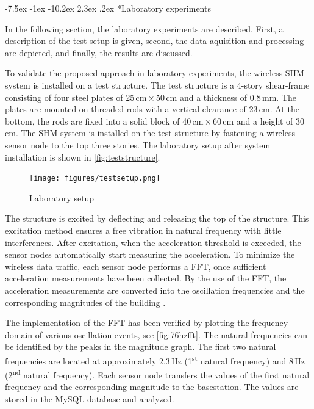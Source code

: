 \documentclass[12pt,a4paper]{scrartcl}
\makeatletter
\renewcommand\section{\@startsection{section}{1}{\z@}%
                     {-7.5ex \@plus -1ex \@minus -10.2ex}%
                     {2.3ex \@plus.2ex}%
                     {\sffamily\large\bfseries}}
\makeatother
\begin{document}


\section*{Laboratory experiments}

In the following section, the laboratory experiments are described.
First, a description of the test setup is given, second, the data aquisition and processing are depicted, and finally, the results are discussed. 

To validate the proposed approach in laboratory experiments, the wireless SHM system is installed on a test structure.
The test structure is a 4-story shear-frame consisting of four steel plates of 25\,cm\,$\times$\,50\,cm and a thickness of 0.8\,mm.
The plates are mounted on threaded rods with a vertical clearance of 23\,cm.
At the bottom, the rods are fixed into a solid block of 40\,cm\,$\times$\,60\,cm and a height of 30\,cm.
The SHM system is installed on the test structure by fastening a wireless sensor node to the top three stories.
The laboratory setup after system installation is shown in \autoref{fig:teststructure}.

\begin{figure}[ht]
    \centering
    \texttt{[image: figures/testsetup.png]}
    \caption{Laboratory setup}
    \label{fig:teststructure}
\end{figure}

The structure is excited by deflecting and releasing the top of the structure.
This excitation method ensures a free vibration in natural frequency with little interferences.
After excitation, when the acceleration threshold is exceeded, the sensor nodes automatically start measuring the acceleration.
To minimize the wireless data traffic, each sensor node performs a FFT, once sufficient acceleration measurements have been collected.
By the use of the FFT, the acceleration measurements are converted into the oscillation frequencies and the corresponding magnitudes of the building \cite{rao2011fast}.

The implementation of the FFT has been verified by plotting the frequency domain of various oscillation events, see \autoref{fig:76hzfft}.
The natural frequencies can be identified by the peaks in the magnitude graph.
The first two natural frequencies are located at approximately 2.3\,Hz (1\textsuperscript{st} natural frequency) and 8\,Hz (2\textsuperscript{nd} natural frequency).
Each sensor node transfers the values of the first natural frequency and the corresponding magnitude to the basestation. 
The values are stored in the MySQL database and analyzed.
\end{document}
